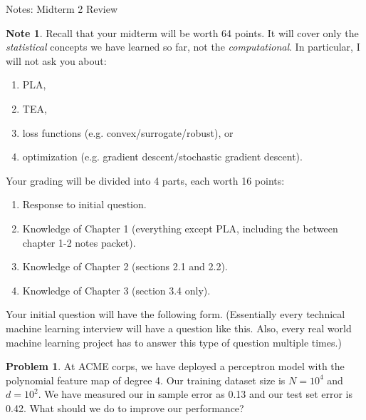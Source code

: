 \documentclass[10pt]{exam}
\theoremstyle{definition}
\newtheorem{problem}{Problem}
\newtheorem{note}{Note}
\begin{document}
\begin{center}
{
\Huge
Notes: Midterm 2 Review
}
\end{center}

\begin{note}
Recall that your midterm will be worth 64 points.
It will cover only the \emph{statistical} concepts we have learned so far,
not the \emph{computational}.
In particular, I will not ask you about:
\begin{enumerate}
    \item PLA,
    \item TEA,
    \item loss functions (e.g. convex/surrogate/robust), or
    \item optimization (e.g. gradient descent/stochastic gradient descent).
\end{enumerate}
Your grading will be divided into 4 parts, each worth 16 points:
\begin{enumerate}
    \item Response to initial question.
    \item Knowledge of Chapter 1 (everything except PLA, including the between chapter 1-2 notes packet).
    \item Knowledge of Chapter 2 (sections 2.1 and 2.2).
    \item Knowledge of Chapter 3 (section 3.4 only).
\end{enumerate}
\end{note}


\newpage
\noindent
Your initial question will have the following form.
(Essentially every technical machine learning interview will have a question like this.
Also, every real world machine learning project has to answer this type of question multiple times.)

\begin{problem}
At ACME corps, we have deployed a perceptron model with the polynomial feature map of degree 4.
Our training dataset size is $N=10^4$ and $d=10^2$.
We have measured our in sample error as 0.13 and our test set error is 0.42.
What should we do to improve our performance?
\end{problem}
\end{document}
